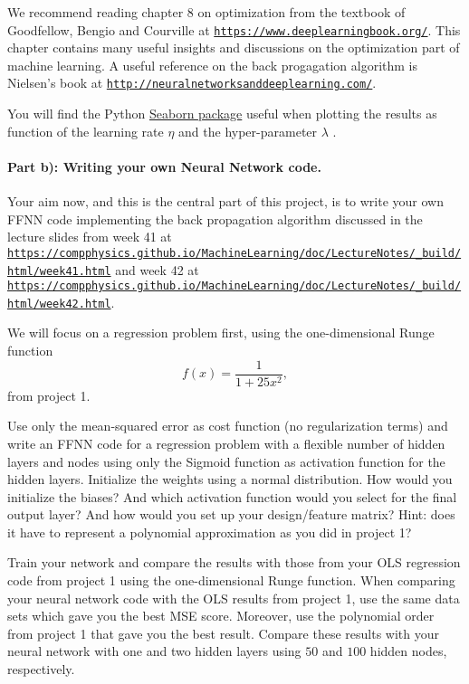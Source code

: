 \documentclass[%
oneside,                 %
final,                   %
10pt]{article}
\begin{document}
We recommend reading chapter 8 on optimization from the textbook of
Goodfellow, Bengio and Courville at
\href{{https://www.deeplearningbook.org/}}{\nolinkurl{https://www.deeplearningbook.org/}}. This chapter contains many
useful insights and discussions on the optimization part of machine
learning.  A useful reference on the back progagation algorithm is
Nielsen's book at \href{{http://neuralnetworksanddeeplearning.com/}}{\nolinkurl{http://neuralnetworksanddeeplearning.com/}}. 

You will find the Python \href{{https://seaborn.pydata.org/generated/seaborn.heatmap.html}}{Seaborn
package}
useful when plotting the results as function of the learning rate
$\eta$ and the hyper-parameter $\lambda$ .

\paragraph{Part b): Writing your own Neural Network code.}
Your aim now, and this is the central part of this project, is to
write your own FFNN code implementing the back
propagation algorithm discussed in the lecture slides from week 41 at \href{{https://compphysics.github.io/MachineLearning/doc/LectureNotes/_build/html/week41.html}}{\nolinkurl{https://compphysics.github.io/MachineLearning/doc/LectureNotes/_build/html/week41.html}} and week 42 at \href{{https://compphysics.github.io/MachineLearning/doc/LectureNotes/_build/html/week42.html}}{\nolinkurl{https://compphysics.github.io/MachineLearning/doc/LectureNotes/_build/html/week42.html}}.

We will focus on a regression problem first, using the one-dimensional Runge function
\[
f(x) = \frac{1}{1+25x^2},
\]
from project 1.

Use only the mean-squared error as cost function (no regularization terms) and 
write an FFNN code for a regression problem with a flexible number of hidden
layers and nodes using only the Sigmoid function as activation function for
the hidden layers. Initialize the weights using a normal
distribution. How would you initialize the biases? And which
activation function would you select for the final output layer?
And how would you set up your design/feature matrix? Hint: does it have to represent a polynomial approximation as you did in project 1? 

Train your network and compare the results with those from your OLS
regression code from project 1 using the one-dimensional Runge
function.  When comparing your neural network code with the OLS
results from project 1, use the same data sets which gave you the best
MSE score. Moreover, use the polynomial order from project 1 that gave you the
best result.  Compare these results with your neural network with one
and two hidden layers using $50$ and $100$ hidden nodes, respectively.
\end{document}
